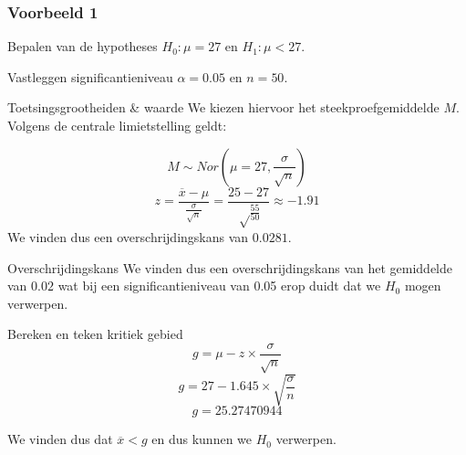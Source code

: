 \documentclass{beamer}
\begin{document}
\begin{frame}
  \frametitle{Voorbeeld 1}
  \begin{block}{Bepalen van de hypotheses}
    $H_{0} : \mu = 27$ en $H_{1}: \mu < 27$.
  \end{block}


  \begin{block}{Vastleggen significantieniveau}
  $\alpha = 0.05$ en $n=50$.
  \end{block}


  \begin{block}{Toetsingsgrootheiden \& waarde}
  We kiezen hiervoor het steekproefgemiddelde $M$. Volgens de centrale limietstelling geldt:

  \[ M \sim Nor(\mu = 27, \frac{\sigma}{\sqrt{n}}) \]
  \[ z = \frac{\overline{x} - \mu}{\frac{\sigma}{\sqrt{n}}} = \frac{25-27}{\sqrt\frac{55}{50}} \approx -1.91\]
  We vinden dus een overschrijdingskans van $0.0281$.
  \end{block}
  \end{frame}

\begin{frame}
    \begin{block}{Overschrijdingskans}
    We vinden dus een overschrijdingskans van het gemiddelde van $0.02$ wat bij een significantieniveau van 0.05 erop duidt dat we $H_{0}$ mogen verwerpen.
    \end{block}

    \begin{block}{Bereken en teken kritiek gebied}
    \[ g = \mu - z \times \frac{\sigma}{\sqrt{n}} \]
    \[ g = 27 - 1.645 \times \sqrt{\frac{\sigma}{n}} \]
    \[ g = 25.27470944 \]

    We vinden dus dat $\overline{x} < g$ en dus kunnen we $H_{0}$ verwerpen.
\end{block}

\end{frame}

\begin{frame}
    \centering
\end{frame}
\end{document}
